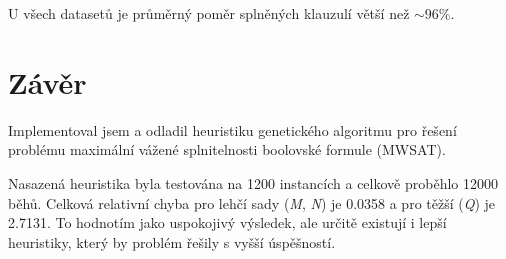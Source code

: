 \documentclass[12pt]{article}
\begin{document}
U všech datasetů je průměrný poměr splněných klauzulí větší než $\sim96\%$. 


\newpage\newpage
\section{Závěr}

Implementoval jsem a odladil heuristiku genetického algoritmu pro řešení problému maximální vážené splnitelnosti boolovské formule (MWSAT). 

Nasazená heuristika byla testována na 1200 instancích a celkově proběhlo 12000 běhů. Celková relativní chyba pro lehčí sady (\textit{M}, \textit{N}) je 0.0358 a pro těžší (\textit{Q}) je 2.7131. To hodnotím jako uspokojivý výsledek, ale určitě existují i lepší heuristiky, který by problém řešily s vyšší úspěšností.
\end{document}
